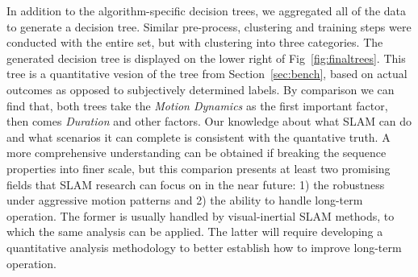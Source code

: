 In addition to the algorithm-specific decision trees, we aggregated all
of the data to generate a decision tree. 
Similar pre-process, clustering and training steps were conducted with the 
entire set, but with clustering into three categories. 
The generated decision tree is displayed on the lower right of
Fig~\ref{fig:finaltrees}. 
This tree is a quantitative vesion of the tree from Section~\ref{sec:bench}, 
based on actual outcomes as opposed to subjectively determined labels.
By comparison we can find that, both trees take the \textit{Motion Dynamics} as 
the first important factor, then comes \textit{Duration} and other factors. 
Our knowledge about what SLAM can do and what scenarios it can complete
is consistent with the quantative truth. 
A more comprehensive understanding can be obtained if breaking the
sequence properties into finer scale, but this comparion presents at
least two promising fields that SLAM research can focus on in the near
future: 
1) the robustness under aggressive motion patterns and 
2) the ability to handle long-term operation.
The former is usually handled by visual-inertial SLAM methods, to which
the same analysis can be applied.  The latter will require developing a
quantitative analysis methodology to better establish how to improve
long-term operation.








